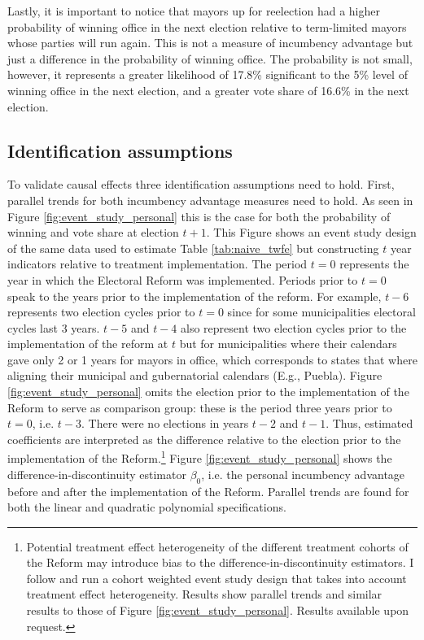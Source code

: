 Lastly, it is important to notice that mayors up for reelection had a higher probability of winning office in the next election relative to term-limited mayors whose parties will run again. This is not a measure of incumbency advantage but just a difference in the probability of winning office. The probability is not small, however, it represents a greater likelihood of 17.8\% significant to the 5\% level of winning office in the next election, and a greater vote share of 16.6\% in the next election. 
   
\subsection{Identification assumptions} 

To validate causal effects three identification assumptions need to hold. First, parallel trends for both incumbency advantage measures need to hold. As seen in Figure \ref{fig:event_study_personal}  this is the case for both the probability of winning and vote share at election $t+1$. This Figure shows an event study design of the same data used to estimate Table \ref{tab:naive_twfe} but constructing $t$ year indicators relative to treatment implementation. The period $t=0$ represents the year in which the Electoral Reform was implemented. Periods prior to $t=0$ speak to the years prior to the implementation of the reform. For example, $t-6$ represents two election cycles prior to $t=0$ since for some municipalities electoral cycles last 3 years.  $t-5$ and $t-4$ also represent two election cycles prior to the implementation of the reform at $t$ but for municipalities where their calendars gave only 2 or 1 years for mayors in office, which corresponds to states that where aligning their municipal and gubernatorial calendars (E.g., Puebla). Figure \ref{fig:event_study_personal} omits the election prior to the implementation of the Reform to serve as comparison group: these is the period three years prior to $t=0$, i.e. $t-3$. There were no elections in years $t-2$ and $t-1$. Thus, estimated coefficients are interpreted as the difference relative to the election prior to the implementation of the Reform.\footnote{Potential treatment effect heterogeneity of the different treatment cohorts of the Reform may introduce bias to the difference-in-discontinuity estimators. I follow \citet{abraham_sun_2020} and run a cohort weighted event study design that takes into account treatment effect heterogeneity. Results show parallel trends and similar results to those of  Figure \ref{fig:event_study_personal}. Results available upon request.} Figure \ref{fig:event_study_personal} shows the difference-in-discontinuity estimator $\beta_0$, i.e. the personal incumbency advantage before and after the implementation of the Reform. Parallel trends are found for both the linear and quadratic polynomial specifications.  

